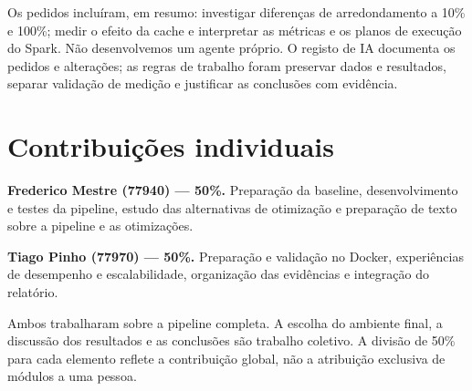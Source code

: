 \documentclass[sigconf]{acmart}
\begin{document}
Os pedidos incluíram, em resumo: investigar diferenças de arredondamento a 10\% e 100\%; medir o
efeito da cache e interpretar as métricas e os planos de execução do Spark. Não desenvolvemos
um agente próprio. O registo de IA documenta os pedidos e alterações;
as regras de trabalho foram preservar dados e resultados, separar
validação de medição e justificar as conclusões com evidência.

\section*{Contribuições individuais}
\textbf{Frederico Mestre (77940) --- 50\%.} Preparação da baseline,
desenvolvimento e testes da pipeline, estudo das alternativas de otimização
e preparação de texto sobre a pipeline e as otimizações.

\textbf{Tiago Pinho (77970) --- 50\%.} Preparação e validação no Docker,
experiências de desempenho e escalabilidade, organização das evidências
e integração do relatório.

Ambos trabalharam sobre a pipeline completa. A escolha do ambiente
final, a discussão dos resultados e as conclusões são trabalho coletivo.
A divisão de 50\% para cada elemento reflete a contribuição global,
não a atribuição exclusiva de módulos a uma pessoa.


\end{document}

